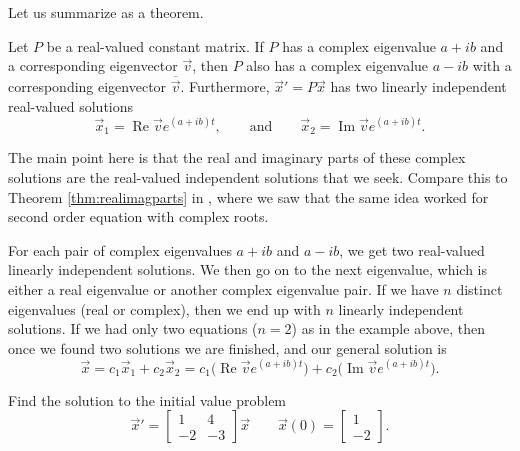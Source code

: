 \medskip

Let us summarize as a theorem. 

\begin{theorem1}{}
Let $P$ be a real-valued constant matrix.
If $P$ has a complex eigenvalue $a+ib$ and a corresponding eigenvector
$\vec{v}$, then $P$ also has a complex eigenvalue $a-ib$ with
a corresponding eigenvector $\overline{\vec{v}}$.
Furthermore,
${\vec{x}}' = P\vec{x}$ has
two linearly independent real-valued solutions
\begin{equation*}
\vec{x}_1 = \operatorname{Re} \vec{v} e^{(a+ib)t} ,
\qquad
\text{and}
\qquad
\vec{x}_2 = \operatorname{Im} \vec{v} e^{(a+ib)t} .
\end{equation*}
\end{theorem1}

The main point here is that the real and imaginary parts of these complex solutions are the real-valued independent solutions that we seek. Compare this to Theorem \ref{thm:realimagparts} in , where we saw that the same idea worked for second order equation with complex roots.

For each pair of complex eigenvalues $a+ib$ and $a-ib$,
we get two real-valued linearly
independent solutions.
We then go on to the next
eigenvalue, which is either a real eigenvalue or another complex eigenvalue
pair.  If we have $n$ distinct eigenvalues (real or complex), then we end up with $n$ linearly independent solutions.
If we had only two equations ($n=2$) as in the example above,
then once we found two solutions we are
finished, and our general solution is
\begin{equation*}
\vec{x} =
c_1 \vec{x}_1 + c_2 \vec{x}_2
= 
c_1 \bigl( \operatorname{Re} \vec{v} e^{(a+ib)t} \bigr) +
c_2 \bigl( \operatorname{Im} \vec{v} e^{(a+ib)t} \bigr)
.
\end{equation*}

\begin{example}
Find the solution to the initial value problem
\begin{equation*}
\vec{x}' = \begin{bmatrix} 1 & 4 \\ -2 & -3 \end{bmatrix}\vec{x} \qquad \vec{x}(0) = \begin{bmatrix} 1 \\ -2 \end{bmatrix}.
\end{equation*}
\end{example}

